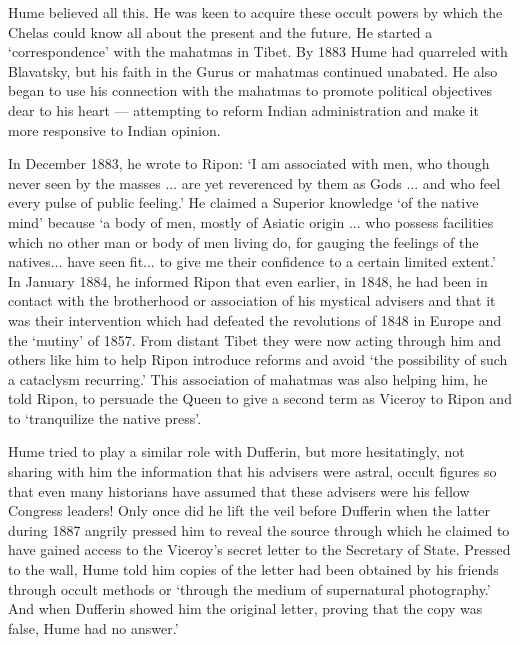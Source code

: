 Hume believed all this. He was keen to acquire these occult powers by which the Chelas could know all about the present and the future. He started a `correspondence' with the mahatmas in Tibet. By 1883 Hume had quarreled with Blavatsky, but his faith in the Gurus or mahatmas continued unabated. He also began to use his connection with the mahatmas to promote political objectives dear to his heart — attempting to reform Indian administration and make it more responsive to Indian opinion.

In December 1883, he wrote to Ripon: `I am associated with men, who though never seen by the masses ... are yet reverenced by them as Gods ... and who feel every pulse of public feeling.' He claimed a Superior knowledge `of the native mind' because `a body of men, mostly of Asiatic origin ... who possess facilities which no other man or body of men living do, for gauging the feelings of the natives... have seen fit... to give me their confidence to a certain limited extent.' In January 1884, he informed Ripon that even earlier, in 1848, he had been in contact with the brotherhood or association of his mystical advisers and that it was their intervention which had defeated the revolutions of 1848 in Europe and the `mutiny' of 1857. From distant Tibet they were now acting through him and others like him to help Ripon introduce reforms and avoid `the possibility of such a cataclysm recurring.' This association of mahatmas was also helping him, he told Ripon, to persuade the Queen to give a second term as Viceroy to Ripon and to `tranquilize the native press'.

Hume tried to play a similar role with Dufferin, but more hesitatingly, not sharing with him the information that his advisers were astral, occult figures so that even many historians have assumed that these advisers were his fellow Congress leaders! Only once did he lift the veil before Dufferin when the latter during 1887 angrily pressed him to reveal the source through which he claimed to have gained access to the Viceroy's secret letter to the Secretary of State. Pressed to the wall, Hume told him copies of the letter had been obtained by his friends through occult methods or `through the medium of supernatural photography.' And when Dufferin showed him the original letter, proving that the copy was false, Hume had no answer.'

